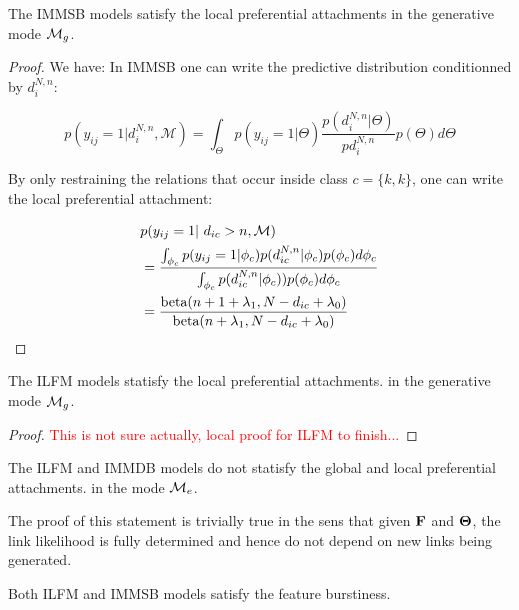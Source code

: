 \begin{proposition}
	The IMMSB models satisfy the local preferential attachments in the generative mode $\mathcal{M}_g$.
\end{proposition}

\begin{proof}
We have:
In IMMSB one can write the predictive distribution conditionned by $d_i^{N,n}$:

\begin{equation} 
p(y_{ij} = 1 | d_i^{N,n}, \mathcal{M}) = \int_{\Theta} p(y_{ij}=1|\Theta) \frac{p(d_i^{N,n} | \Theta)}{pd_i^{N,n}} p(\Theta) d\Theta \nonumber
\end{equation}

By only restraining the relations that occur inside class $c=\{k,k\}$, one can write the local preferential attachment:

\begin{align*} \label{eq:sum}
&p(y_{ij} = 1 | d_{ic}>n, \mathcal{M})  \\
&=  \frac{ \int_{\phi_{c}} p(y_{ij}=1|\phi_{c}) p(d_{ic}^{N,n} | \phi_{c}) p(\phi_{c}) d\phi_{c}}{\int_{\phi_{c}} \p(d_{ic}^{N,n} | \phi_{c}))       p(\phi_{c}) d\phi_{c}}   \\
&= \frac{ \text{beta}(n+1+\lambda_1, N-d_{ic}+\lambda_0) }{\text{beta}(n+\lambda_1, N-d_{ic}+\lambda_0) } 
\end{align*}


\end{proof}

\begin{proposition}
	The ILFM models statisfy the local preferential attachments. in the generative mode $\mathcal{M}_g$.
\end{proposition}
\begin{proof}
	\textcolor{red}{This is not sure actually, local proof for ILFM to finish...}
\end{proof}

\begin{proposition}
	The ILFM and IMMDB models do not statisfy the global and local preferential attachments. in the mode $\mathcal{M}_e$.
\end{proposition}

The proof of this statement is trivially true in the sens that given $\mathbf{F}$ and $\mathbf{\Theta}$, the link likelihood is fully determined and hence do not depend on new links being generated. 

\begin{proposition}
	Both ILFM and IMMSB models satisfy the feature burstiness.
\end{proposition}

